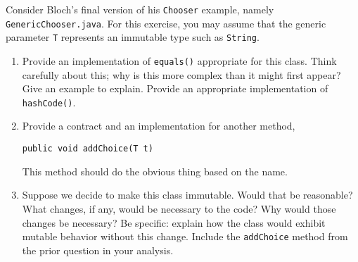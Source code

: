 Consider Bloch's final version of his {\tt Chooser} example, namely {\tt GenericChooser.java}.
For this exercise, you may assume that the generic parameter {\tt T}
represents an immutable type such as {\tt String}.


\begin{enumerate}
\item
Provide an implementation of {\tt equals()}
appropriate for this class.
Think carefully about this; why is this more complex than it
might first appear?  Give an example to explain.
Provide an appropriate implementation of {\tt hashCode()}.
\item
Provide a contract and an implementation for another method,
\begin{verbatim}
public void addChoice(T t)
\end{verbatim}
This method should do the obvious thing based on the name.
\item
Suppose we decide to make this class immutable.
Would that be reasonable?  What changes, if any, would be necessary to the code?
Why would those changes be necessary?  Be specific:
explain how the class would exhibit mutable behavior without this change.
Include the {\tt addChoice} 
method from the prior question in your analysis.
\end{enumerate}

